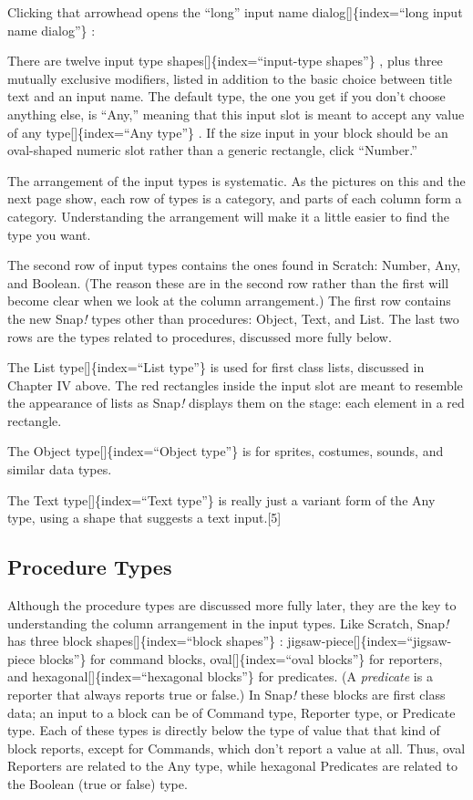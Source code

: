 \documentclass[
  letterpaper,
]{book}
\begin{document}
Clicking that arrowhead opens the ``long'' input name
dialog{[}{]}\{index=``long input name dialog''\} :

There are twelve input type shapes{[}{]}\{index=``input-type shapes''\}
, plus three mutually exclusive modifiers, listed in addition to the
basic choice between title text and an input name. The default type, the
one you get if you don't choose anything else, is ``Any,'' meaning that
this input slot is meant to accept any value of any
type{[}{]}\{index=``Any type''\} . If the size input in your block
should be an oval-shaped numeric slot rather than a generic rectangle,
click ``Number.''

The arrangement of the input types is systematic. As the pictures on
this and the next page show, each row of types is a category, and parts
of each column form a category. Understanding the arrangement will make
it a little easier to find the type you want.

The second row of input types contains the ones found in Scratch:
Number, Any, and Boolean. (The reason these are in the second row rather
than the ﬁrst will become clear when we look at the column arrangement.)
The ﬁrst row contains the new Snap\emph{!} types other than procedures:
Object, Text, and List. The last two rows are the types related to
procedures, discussed more fully below.

The List type{[}{]}\{index=``List type''\} is used for ﬁrst class lists,
discussed in Chapter IV above. The red rectangles inside the input slot
are meant to resemble the appearance of lists as Snap\emph{!} displays
them on the stage: each element in a red rectangle.

The Object type{[}{]}\{index=``Object type''\} is for sprites, costumes,
sounds, and similar data types.

The Text type{[}{]}\{index=``Text type''\} is really just a variant form
of the Any type, using a shape that suggests a text input.{[}5{]}

\subsection{Procedure Types}\label{procedure-types}

Although the procedure types are discussed more fully later, they are
the key to understanding the column arrangement in the input types. Like
Scratch, Snap\emph{!} has three block shapes{[}{]}\{index=``block
shapes''\} : jigsaw-piece{[}{]}\{index=``jigsaw-piece blocks''\} for
command blocks, oval{[}{]}\{index=``oval blocks''\} for reporters, and
hexagonal{[}{]}\{index=``hexagonal blocks''\} for predicates. (A
\emph{predicate} is a reporter that always reports true or false.) In
Snap\emph{!} these blocks are ﬁrst class data; an input to a block can
be of Command type, Reporter type, or Predicate type. Each of these
types is directly below the type of value that that kind of block
reports, except for Commands, which don't report a value at all. Thus,
oval Reporters are related to the Any type, while hexagonal Predicates
are related to the Boolean (true or false) type.
\end{document}
